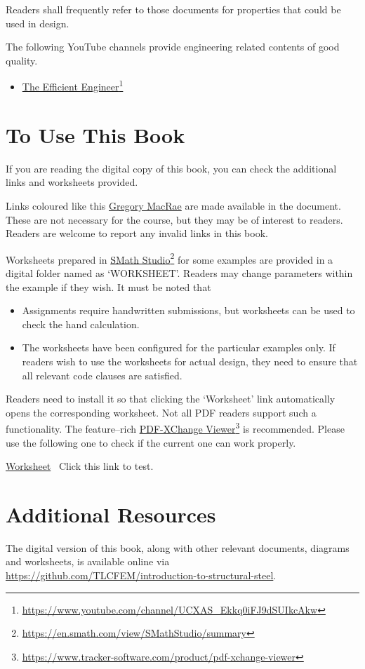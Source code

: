 Readers shall frequently refer to those documents for properties that could be used in design.

The following YouTube channels provide engineering related contents of good quality.
\begin{itemize}
\item \href{https://www.youtube.com/channel/UCXAS_Ekkq0iFJ9dSUIkcAkw}{The Efficient Engineer}\footnote{\url{https://www.youtube.com/channel/UCXAS_Ekkq0iFJ9dSUIkcAkw}}
\end{itemize}
\section{To Use This Book}
If you are reading the digital copy of this book, you can check the additional links and worksheets provided.

Links coloured like this \href{https://profiles.canterbury.ac.nz/Gregory-MacRae}{Gregory MacRae} are made available in the document.
These are not necessary for the course, but they may be of interest to readers.
Readers are welcome to report any invalid links in this book.

Worksheets prepared in \href{https://en.smath.com/view/SMathStudio/summary}{SMath Studio}\footnote{\url{https://en.smath.com/view/SMathStudio/summary}} for some examples are provided in a digital folder named as `WORKSHEET'.
Readers may change parameters within the example if they wish.
It must be noted that
\begin{itemize}
\item Assignments require handwritten submissions, but worksheets can be used to check the hand calculation.
\item The worksheets have been configured for the particular examples only.
If readers wish to use the worksheets for actual design, they need to ensure that all relevant code clauses are satisfied.
\end{itemize}

Readers need to install it so that clicking the `Worksheet' link automatically opens the corresponding worksheet.
Not all PDF readers support such a functionality.
The feature--rich \href{https://www.tracker-software.com/product/pdf-xchange-viewer}{PDF-XChange Viewer}\footnote{\url{https://www.tracker-software.com/product/pdf-xchange-viewer}} is recommended.
Please use the following one to check if the current one can work properly.
\begin{exmp}
\href{run:./WORKSHEET/CH00/EX0.TEST.sm}{Worksheet}
\textleftarrow~Click this link to test.
\end{exmp}
\section{Additional Resources}
The digital version of this book, along with other relevant documents, diagrams and worksheets, is available online via \href{https://github.com/TLCFEM/introduction-to-structural-steel}{\url{https://github.com/TLCFEM/introduction-to-structural-steel}}.
